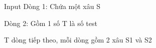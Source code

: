 Input
Dòng 1: Chứa một xâu S  

   Dòng 2: Gồm 1 số T là số test  

   T dòng tiếp theo, mỗi dòng gồm 2 xâu S1 và S2